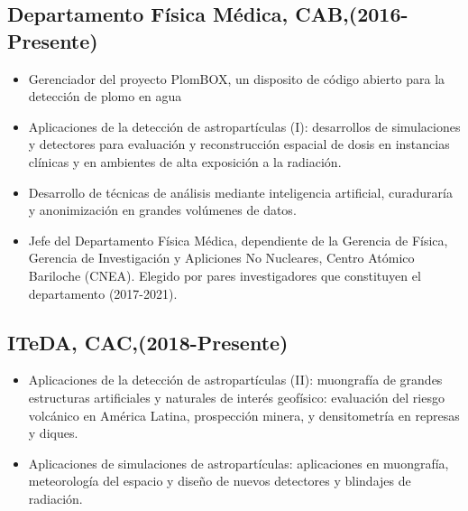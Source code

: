 \subsection*{Departamento Física Médica, CAB,(2016-Presente)}
\begin{itemize}
	\item Gerenciador del proyecto PlomBOX, un disposito de código abierto para la detección de plomo en agua
	\item Aplicaciones de la detección de astropartículas (I): desarrollos
		de simulaciones y detectores para evaluación y reconstrucción
		espacial de dosis en instancias clínicas y en ambientes de
		alta exposición a la radiación.
	\item Desarrollo de técnicas de análisis mediante inteligencia artificial, curaduraría y anonimización en grandes volúmenes de datos.
 	\item Jefe del Departamento Física Médica, dependiente de la
		Gerencia de Física, Gerencia de Investigación y Apliciones No
		Nucleares, Centro Atómico Bariloche (CNEA). Elegido por pares
		investigadores que constituyen el departamento (2017-2021).
\end{itemize}

\subsection*{ITeDA, CAC,(2018-Presente)}
\begin{itemize}
	\item Aplicaciones de la detección de astropartículas (II): muongrafía de grandes estructuras artificiales y naturales de interés geofísico: evaluación del riesgo volcánico en América Latina, prospección minera, y densitometría en represas y diques.
	\item Aplicaciones de simulaciones de astropartículas: aplicaciones en muongrafía, meteorología del espacio y diseño de nuevos detectores y blindajes de radiación.
\end{itemize}

